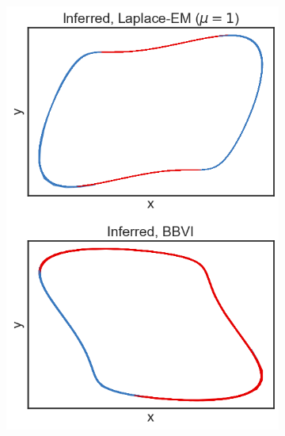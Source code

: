 \begin{figure}
    \begin{subfigure}[b]{0.33\linewidth}
        \centering
        \includegraphics[width=\linewidth]{./Figures/vdp-good-mu1.png}
        \caption{}
        \label{goodvdp:a}
        \vspace{4ex}
    \end{subfigure}%
    \begin{subfigure}[b]{0.33\linewidth}
        \centering

\end{subfigure}
\end{figure}

